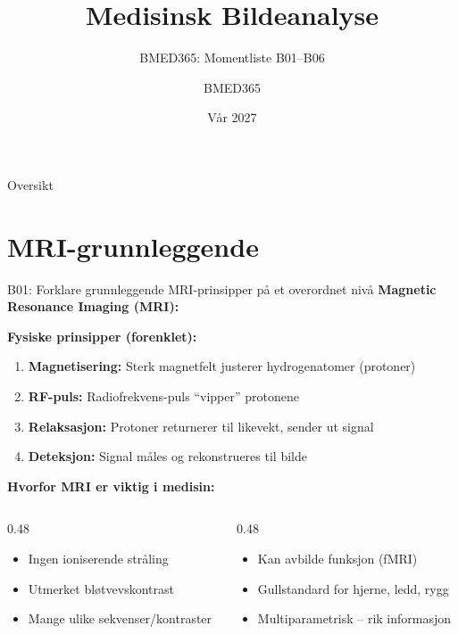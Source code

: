 \documentclass[aspectratio=169, 10pt]{beamer}
\title{Medisinsk Bildeanalyse}
\subtitle{BMED365: Momentliste B01--B06}
\author{BMED365}
\date{Vår 2027}
\begin{document}
\begin{frame}
    \titlepage
\end{frame}

\begin{frame}{Oversikt}
    \tableofcontents
\end{frame}

\section{MRI-grunnleggende}

\begin{frame}{B01: Forklare grunnleggende MRI-prinsipper på et overordnet nivå}
    \textbf{Magnetic Resonance Imaging (MRI):}
    
    \vspace{0.3cm}
    \textbf{Fysiske prinsipper (forenklet):}
    \begin{enumerate}
        \item \textbf{Magnetisering:} Sterk magnetfelt justerer hydrogenatomer (protoner)
        \item \textbf{RF-puls:} Radiofrekvens-puls ``vipper'' protonene
        \item \textbf{Relaksasjon:} Protoner returnerer til likevekt, sender ut signal
        \item \textbf{Deteksjon:} Signal måles og rekonstrueres til bilde
    \end{enumerate}
    
    \vspace{0.3cm}
    \textbf{Hvorfor MRI er viktig i medisin:}
    \begin{columns}[T]
        \begin{column}{0.48\textwidth}
            \begin{itemize}
                \item Ingen ioniserende stråling
                \item Utmerket bløtvevskontrast
                \item Mange ulike sekvenser/kontraster
            \end{itemize}
        \end{column}
        \begin{column}{0.48\textwidth}
            \begin{itemize}
                \item Kan avbilde funksjon (fMRI)
                \item Gullstandard for hjerne, ledd, rygg
                \item Multiparametrisk -- rik informasjon
            \end{itemize}
        \end{column}
    \end{columns}
    

\end{frame}
\end{document}
